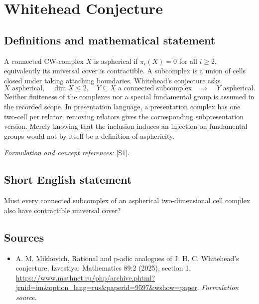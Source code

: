\documentclass[11pt]{article}
\begin{document}
\section*{\texorpdfstring{Whitehead Conjecture}{Whitehead Conjecture}}\label{statement}
\subsection{Definitions and mathematical statement}
A connected CW-complex $X$ is aspherical if $\pi_i(X)=0$ for all $i\ge2$, equivalently its universal cover is contractible. A subcomplex is a union of cells closed under taking attaching boundaries. Whitehead's conjecture asks
\[
 X\text{ aspherical},\quad\dim X\le2,\quad
 Y\subseteq X\text{ a connected subcomplex}
 \quad\Longrightarrow\quad Y\text{ aspherical}.
\]
Neither finiteness of the complexes nor a special fundamental group is assumed in the recorded scope. In presentation language, a presentation complex has one two-cell per relator; removing relators gives the corresponding subpresentation version. Merely knowing that the inclusion induces an injection on fundamental groups would not by itself be a definition of asphericity.
\par\smallskip\textit{Formulation and concept references:} \href{https://www.mathnet.ru/php/archive.phtml?jrnid=im&option_lang=rus&paperid=9597&wshow=paper}{[S1]}.

\subsection{Short English statement}
Must every connected subcomplex of an aspherical two-dimensional cell complex also have contractible universal cover?
\subsection{Sources}
\begin{itemize}
\item[S1]A. M. Mikhovich, Rational and p-adic analogues of J. H. C. Whitehead's conjecture, Izvestiya: Mathematics 89:2 (2025), section 1.
\url{https://www.mathnet.ru/php/archive.phtml?jrnid=im&option_lang=rus&paperid=9597&wshow=paper}.
\textit{Formulation source.}
\end{itemize}
\end{document}
